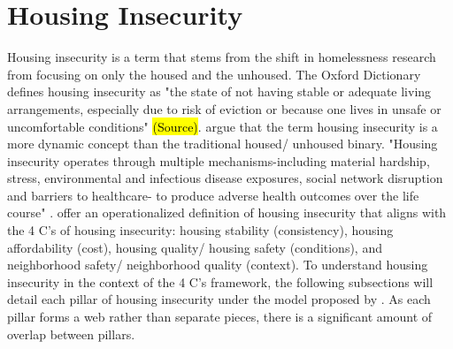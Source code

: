 \section{Housing Insecurity}
Housing insecurity is a term that stems from the shift in homelessness research from focusing on only the housed and the unhoused. The Oxford Dictionary defines housing insecurity as "the state of not having stable or adequate living arrangements, especially due to risk of eviction or because one lives in unsafe or uncomfortable conditions" \hl{(Source)}. \citep{deluca_housing_2022} argue that the term housing insecurity is a more dynamic concept than the traditional housed/ unhoused binary. "Housing insecurity operates through multiple mechanisms-including material hardship, stress, environmental and infectious disease exposures, social network disruption and barriers to healthcare- to produce adverse health outcomes over the life course" \citep{leifheit_building_2022}. \citet{cox_road_2019} offer an operationalized definition of housing insecurity that aligns with the 4 C's of housing insecurity: housing stability (consistency), housing affordability (cost), housing quality/ housing safety (conditions), and neighborhood safety/ neighborhood quality (context). To understand housing insecurity in the context of the 4 C's framework, the following subsections will detail each pillar of housing insecurity under the model proposed by \citep{hernandez_housing_2019}. As each pillar forms a web rather than separate pieces, there is a significant amount of overlap between pillars. 
 
